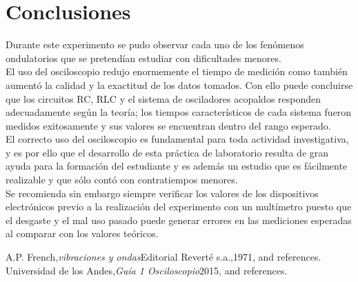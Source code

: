 \documentclass[%
 reprint,
 amsmath,amssymb,
 aps,
]{revtex4-1}
\begin{document}
\section{\label{sec:level1}Conclusiones}
 Durante este experimento se pudo observar cada uno de los fen\'omenos ondulatorios que se pretend\'ian estudiar con dificultades menores. \\

El uso del osciloscopio redujo enormemente el tiempo de medici\'on como tambi\'en aument\'o la calidad y la exactitud de los datos tomados. Con ello puede concluirse que los circuitos RC, RLC y el sistema de osciladores acopaldos responden adecuadamente seg\'un la teor\'ia; los tiempos caracter\'isticos de cada sistema fueron medidos exitosamente y sus valores se encuentran dentro del rango esperado.\\ 

El correcto uso del osciloscopio es fundamental para toda actividad investigativa, y es por ello que el desarrollo de esta pr\'actica de laboratorio resulta de gran ayuda para la formaci\'on del estudiante y es adem\'as un estudio que es f\'acilmente realizable y que s\'olo cont\'o con contratiempos menores.\\ 

Se recomienda sin embargo siempre verificar los valores de los dispositivos electr\'onicos previo a la realizaci\'on del experimento con un mult\'imetro puesto que el desgaste y el mal uso pasado puede generar errores en las mediciones esperadas al comparar con los valores te\'oricos.\\



\begin{thebibliography}{99} 
 A.P. French,{\it vibraciones y ondas}{Editorial Reverté s.a.,1971}, and references.\\ 
 Universidad de los Andes,{\it Guía 1 Osciloscopio}{2015}, and references.\\ \end{thebibliography}
\end{document}

